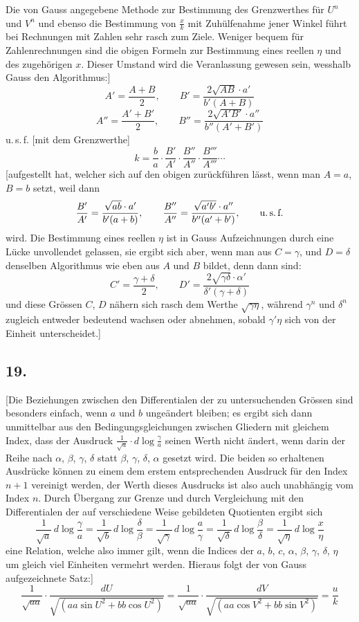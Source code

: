 \documentclass[10pt,a4paper]{article}
\begin{document}
Die von Gauss angegebene Methode zur Bestimmung des Grenzwerthes für
$U^n$ und $V^n$ und ebenso die Bestimmung von $\frac{x}{k}$ mit Zuhülfenahme jener Winkel
führt bei Rechnungen mit Zahlen sehr rasch zum Ziele. Weniger bequem
für Zahlenrechnungen sind die obigen Formeln zur Bestimmung eines reellen $\eta$
und des zugehörigen $x$. Dieser Umstand wird die Veranlassung gewesen sein,
wesshalb Gauss den Algorithmus:]
\[
A'=\frac{A+B}{2}, \qquad B'=\frac{2\sqrt{AB}\cdot a'}{b'(A+B)}
\]
\[
A''=\frac{A'+B'}{2}, \qquad B''=\frac{2\sqrt{A'B'}\cdot a''}{b''(A'+B')}
\]
u.\,s.\,f. [mit dem Grenzwerthe]
\[
k = \frac{b}{a}\cdot\frac{B'}{A'}\cdot\frac{B''}{A''}\cdot\frac{B'''}{A'''}\cdots
\]
[aufgestellt hat, welcher sich auf den obigen zurückführen lässt, wenn man
$A=a$, $B=b$ setzt, weil dann
\[
\frac{B'}{A'}=\frac{\sqrt{ab}\cdot a'}{b'(a+b)}, \qquad
\frac{B''}{A''}=\frac{\sqrt{a'b'}\cdot a''}{b''(a'+b')}, \qquad \text{u.\,s.\,f.}
\]
wird. Die Bestimmung eines reellen $\eta$ ist in Gauss Aufzeichnungen durch eine
Lücke unvollendet gelassen, sie ergibt sich aber, wenn man aus $C=\gamma$, und
$D=\delta$ denselben Algorithmus wie eben aus $A$ und $B$ bildet, denn dann sind:
\[
C'=\frac{\gamma+\delta}{2}, \qquad D'=\frac{2\sqrt{\gamma\delta}\cdot\alpha'}{\delta'(\gamma+\delta)}
\]
und diese Grössen $C$, $D$ nähern sich rasch dem Werthe $\sqrt{\gamma\eta}$, während $\gamma^n$ und
$\delta^n$ zugleich entweder bedeutend wachsen oder abnehmen, sobald $\gamma'\eta$ sich von
der Einheit unterscheidet.]


\subsection*{19.}

[Die Beziehungen zwischen den Differentialen der zu untersuchenden Grössen
sind besonders einfach, wenn $a$ und $b$ ungeändert bleiben; es ergibt sich dann
unmittelbar aus den Bedingungsgleichungen zwischen Gliedern mit gleichem Index,
dass der Ausdruck $\frac{1}{\sqrt{a}}\cdot d\log\frac{\gamma}{a}$ seinen Werth nicht ändert, wenn
darin der Reihe nach $\alpha$, $\beta$, $\gamma$, $\delta$ statt $\beta$, $\gamma$, $\delta$, $\alpha$ gesetzt wird. Die beiden so erhaltenen Ausdrücke können zu einem dem erstem entsprechenden Ausdruck für
den Index $n+1$ vereinigt werden, der Werth dieses Ausdrucks ist also auch
unabhängig vom Index $n$. Durch Übergang zur Grenze und durch Vergleichung
mit den Differentialen der auf verschiedene Weise gebildeten Quotienten ergibt sich
\[
\frac{1}{\sqrt{a}}\,d\log\frac{\gamma}{a} = \frac{1}{\sqrt{b}}\,d\log\frac{\delta}{\beta}
= \frac{1}{\sqrt{\gamma}}\,d\log\frac{a}{\gamma} = \frac{1}{\sqrt{\delta}}\,d\log\frac{\beta}{\delta}
= \frac{1}{\sqrt{\eta}}\,d\log\frac{x}{\eta}
\]
eine Relation, welche also immer gilt, wenn die Indices der $a$, $b$, $c$, $\alpha$, $\beta$, $\gamma$, $\delta$, $\eta$
um gleich viel Einheiten vermehrt werden. Hieraus folgt der von Gauss aufgezeichnete Satz:]
\[
\frac{1}{\sqrt{aa}}\cdot\frac{dU}{\sqrt{(aa\sin U^2+bb\cos U^2)}}
= \frac{1}{\sqrt{aa}}\cdot\frac{dV}{\sqrt{(aa\cos V^2+bb\sin V^2)}} = \frac{u}{k}
\]
\end{document}
